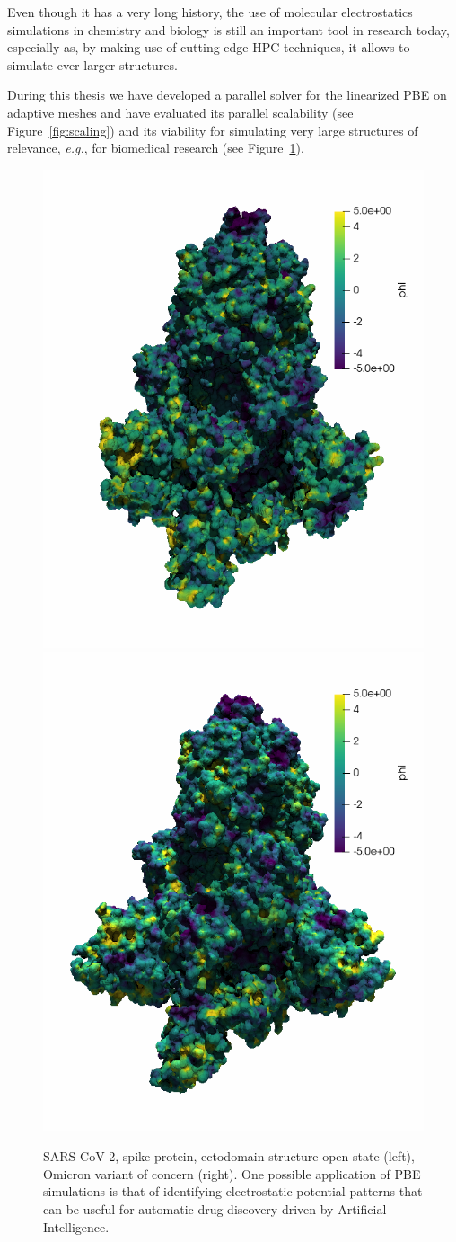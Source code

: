 \documentclass[11pt,a4paper,twocolumn]{article}
\begin{document}


Even though it has a very long history, 
the use of molecular electrostatics simulations in chemistry
and biology is still an important tool in research today, 
especially as, by making use of cutting-edge HPC techniques,
it allows to simulate ever larger structures.

During this thesis we have developed a parallel solver
for the linearized PBE on adaptive meshes 
and have evaluated its parallel scalability (see Figure~\ref{fig:scaling}) and its viability for 
simulating very large structures of relevance, \textit{e.g.}, for biomedical research (see Figure~\ref{fig:covidVSomicron}).

\begin{figure}
    \centering
    \includegraphics[width=.4\linewidth]{Images/covid} \qquad
    \includegraphics[width=.4\linewidth]{Images/omicron}
    \caption{SARS-CoV-2, spike protein,  ectodomain structure open state (left), 
    Omicron variant of concern (right). One possible application of PBE simulations is that of identifying electrostatic potential patterns that can be useful for automatic drug discovery driven by Artificial Intelligence.}
    \label{fig:covidVSomicron}
\end{figure}
\end{document}
